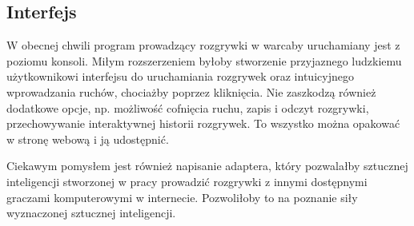 \subsection{Interfejs}

W obecnej chwili program prowadzący rozgrywki w warcaby uruchamiany jest z poziomu konsoli. Miłym rozszerzeniem byłoby stworzenie przyjaznego ludzkiemu użytkownikowi interfejsu do uruchamiania rozgrywek oraz intuicyjnego wprowadzania ruchów, chociażby poprzez kliknięcia. Nie zaszkodzą również dodatkowe opcje, np. możliwość cofnięcia ruchu, zapis i odczyt rozgrywki, przechowywanie interaktywnej historii rozgrywek. To wszystko można opakować w stronę webową i ją udostępnić.

Ciekawym pomysłem jest również napisanie adaptera, który pozwalałby sztucznej inteligencji stworzonej w pracy prowadzić rozgrywki z innymi dostępnymi graczami komputerowymi w internecie. Pozwoliłoby to na poznanie siły wyznaczonej sztucznej inteligencji.

